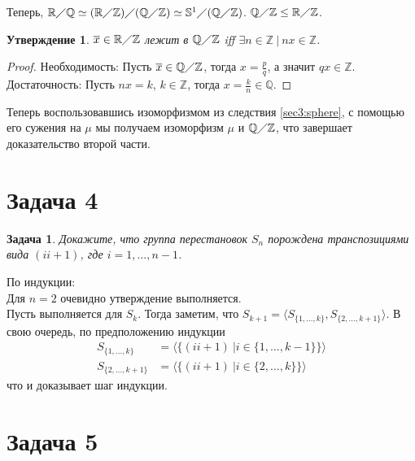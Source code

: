 \documentclass{article}
\newtheorem{task}{Задача}
\newtheorem{statement}{Утверждение}
\newcommand{\gen}[1]{\langle #1 \rangle}
\newcommand{\srange}[2]{\{#1, \dots, #2\}}
\newcommand{\range}[2]{#1, \dots, #2}
\newcommand{\subgroup}{\leq}
\newcommand{\isomorphic}{\simeq}
\newcommand{\sphere}[1]{\mathbb{S}^{#1}}
\newcommand{\quotient}[2]{#1 \diagup #2}
\newcommand{\R}{\mathbb{R}}
\newcommand{\Q}{\mathbb{Q}}
\newcommand{\Z}{\mathbb{Z}}
\newcommand{\class}[1]{\overline{#1}}
\begin{document}
Теперь, 
\begin{math}
    \quotient{\R}{\Q} \isomorphic
    \quotient{(\quotient{\R}{\Z})}{(\quotient{\Q}{\Z})} \isomorphic
    \quotient{\sphere{1}}{(\quotient{\Q}{\Z})}
\end{math}.
$\quotient{\Q}{\Z} \subgroup \quotient{\R}{\Z}$.

\begin{statement}
$\class{x} \in \quotient{\R}{\Z}$ лежит в $\quotient{\Q}{\Z}$ iff $\exists n \in \Z ~ | ~ n x \in \Z$. 
\end{statement}

\begin{proof}
    Необходимость: 
    Пусть $\class{x} \in \quotient{\Q}{\Z}$, тогда $x = \frac{p}{q}$, а значит $q x \in \Z$.
    Достаточность:
    Пусть $n x = k$, $k \in \Z$, тогда $x = \frac{k}{n} \in \Q$.
\end{proof}

Теперь воспользовавшись изоморфизмом из следствия \ref{sec3:sphere}, 
с помощью его сужения на $\mu$ мы получаем изоморфизм $\mu$ и $\quotient{\Q}{\Z}$, что завершает доказательство второй части.

\section*{Задача 4}

\begin{task}
Докажите, что группа перестановок $S_n$ порождена транспозициями вида $(i i + 1)$, где $i = \range{1}{n - 1}$.
\end{task}

По индукции: \\ 

Для $n = 2$ очевидно утверждение выполняется.\\

Пусть выполняется для $S_k$. 
Тогда заметим, что $S_{k + 1} = \gen{S_{\srange{1}{k}}, S_{\srange{2}{k + 1}}}$.
В свою очередь, по предположению индукции 
\begin{align*}
    S_{\srange{1}{k}} &= \gen{\{(i i + 1) ~ | i \in \srange{1}{k - 1}\}} \\
    S_{\srange{2}{k + 1}} &= \gen{\{(i i + 1) ~ | i \in \srange{2}{k}\}}
\end{align*}
что и доказывает шаг индукции.


\section*{Задача 5}
\end{document}

